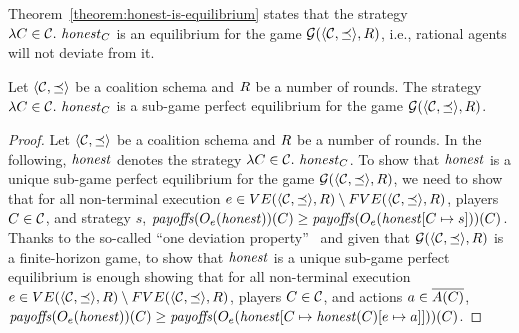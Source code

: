 %
Theorem~\ref{theorem:honest-is-equilibrium} states that the strategy $\lambda C \in \coalitionSchema.\ \honest_C$ is an  equilibrium for the game $\game{\tup{\coalitionSchema, \preceq}, \rounds}$, i.e., rational agents will not deviate from it.


\begin{theorem}\label{theorem:honest-is-equilibrium}
Let $\tup{\coalitionSchema, \preceq}$ be a coalition schema and $\rounds$ be a number of rounds.
%
The strategy $\lambda C \in \coalitionSchema.\ \honest_C$ is a sub-game perfect equilibrium for the game $\game{\tup{\coalitionSchema, \preceq}, \rounds}$.
\end{theorem}

\begin{proof}
Let $\tup{\coalitionSchema, \preceq}$ be a coalition schema and $\rounds$ be a number of rounds.
%
In the following, $\honest$ denotes the strategy $\lambda C \in \coalitionSchema.\ \honest_C$.
%
To show that $\honest$ is a unique sub-game perfect equilibrium for the game $\game{\tup{\coalitionSchema, \preceq}, \rounds}$, we need to show that for all non-terminal execution $e \in VE(\tup{\coalitionSchema,\preceq},\rounds) \setminus FVE(\tup{\coalitionSchema,\preceq},\rounds)$, players $C \in \coalitionSchema$, and strategy $s$, $\payoffs(\subgameOutcome{\honest}{e})(C) \geq \payoffs(\subgameOutcome{\honest[C \mapsto s]}{e})(C)$.
%
Thanks to the so-called ``one deviation property''~\cite[Lemma 98.2]{osborne1994course} and given that $\game{\tup{\coalitionSchema, \preceq}, \rounds}$ is a finite-horizon game, to show that $\honest$ is a unique sub-game perfect equilibrium is enough showing that for all non-terminal execution $e \in VE(\tup{\coalitionSchema,\preceq},\rounds) \setminus FVE(\tup{\coalitionSchema,\preceq},\rounds)$, players $C \in \coalitionSchema$, and actions $a \in \coalitionActions{C}$, $\payoffs(\subgameOutcome{\honest}{e})(C) \geq \payoffs(\subgameOutcome{\honest[C \mapsto \honest(C)[e \mapsto a]]}{e})(C)$.


\end{proof}
